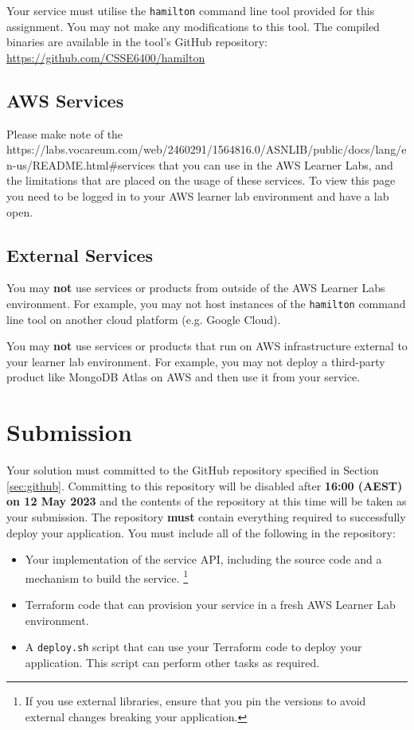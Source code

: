 \documentclass{csse4400}
\begin{document}
Your service must utilise the \texttt{hamilton} command line tool provided for this assignment.
You may not make any modifications to this tool.
The compiled binaries are available in the tool's GitHub repository:
\url{https://github.com/CSSE6400/hamilton}

\subsection{AWS Services}
Please make note of the 
{https://labs.vocareum.com/web/2460291/1564816.0/ASNLIB/public/docs/lang/en-us/README.html\#services}
that you can use in the AWS Learner Labs, and the limitations that are placed on the usage of these services.
To view this page you need to be logged in to your AWS learner lab environment and have a lab open.

\subsection{External Services}
You may \textbf{not} use services or products from outside of the AWS Learner Labs environment.
For example, you may not host instances of the \texttt{hamilton} command line tool on another cloud platform
(e.g. Google Cloud).

You may \textbf{not} use services or products that run on AWS infrastructure external to your learner lab environment.
For example, you may not deploy a third-party product like MongoDB Atlas on AWS and then use it from your service.

\section{Submission}
Your solution must committed to the GitHub repository specified in Section \ref{sec:github}.
Committing to this repository will be disabled after \textbf{16:00 (AEST) on 12 May 2023} and the contents of the repository at this time will be taken as your submission.
The repository \textbf{must} contain everything required to successfully deploy your application.
You must include all of the following in the repository:
\begin{itemize}
  \item Your implementation of the service API, including the source code and a mechanism to build the service.%
  \footnote{If you use external libraries, ensure that you pin the versions to avoid external changes breaking your application.}
  \item Terraform code that can provision your service in a fresh AWS Learner Lab environment.
  \item A \texttt{deploy.sh} script that can use your Terraform code to deploy your application.
    This script can perform other tasks as required.
\end{itemize}
\end{document}
